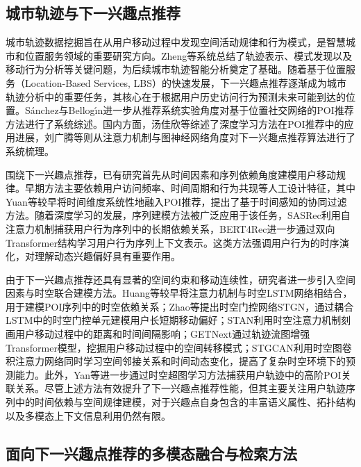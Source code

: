 \documentclass{rjthesis}
\begin{document}
\subsection{城市轨迹与下一兴趣点推荐}

城市轨迹数据挖掘旨在从用户移动过程中发现空间活动规律和行为模式，是智慧城市和位置服务领域的重要研究方向。Zheng等系统总结了轨迹表示、模式发现以及移动行为分析等关键问题，为后续城市轨迹智能分析奠定了基础\cite{zheng2015trajectory}。随着基于位置服务（Location-Based Services, LBS）的快速发展，下一兴趣点推荐逐渐成为城市轨迹分析中的重要任务，其核心在于根据用户历史访问行为预测未来可能到达的位置。S{\'a}nchez与Bellog{\'\i}n进一步从推荐系统实验角度对基于位置社交网络的POI推荐方法进行了系统综述\cite{sanchez2022poisurvey}。国内方面，汤佳欣等综述了深度学习方法在POI推荐中的应用进展\cite{tang2022dlpoi}，刘广腾等则从注意力机制与图神经网络角度对下一兴趣点推荐算法进行了系统梳理\cite{liu2025poisurvey}。

围绕下一兴趣点推荐，已有研究首先从时间因素和序列依赖角度建模用户移动规律。早期方法主要依赖用户访问频率、时间周期和行为共现等人工设计特征，其中Yuan等较早将时间维度系统性地融入POI推荐，提出了基于时间感知的协同过滤方法\cite{yuan2013timeaware}。随着深度学习的发展，序列建模方法被广泛应用于该任务，SASRec利用自注意力机制捕获用户行为序列中的长期依赖关系\cite{kang2018sasrec}，BERT4Rec进一步通过双向Transformer结构学习用户行为序列上下文表示\cite{sun2019bert4rec}。这类方法强调用户行为的时序演化，对理解动态兴趣偏好具有重要作用。

由于下一兴趣点推荐还具有显著的空间约束和移动连续性，研究者进一步引入空间因素与时空联合建模方法。Huang等较早将注意力机制与时空LSTM网络相结合，用于建模POI序列中的时空依赖关系\cite{huang2019atstlstm}；Zhao等提出时空门控网络STGN，通过耦合LSTM中的时空门控单元建模用户长短期移动偏好\cite{zhao2022stgn}；STAN利用时空注意力机制刻画用户移动过程中的距离和时间间隔影响\cite{luo2021stan}；GETNext通过轨迹流图增强Transformer模型，挖掘用户移动过程中的空间转移模式\cite{yang2022getnext}；STGCAN利用时空图卷积注意力网络同时学习空间邻接关系和时间动态变化，提高了复杂时空环境下的预测能力\cite{wang2022stgcan}。此外，Yan等进一步通过时空超图学习方法捕获用户轨迹中的高阶POI关联关系\cite{yan2023sthg}。尽管上述方法有效提升了下一兴趣点推荐性能，但其主要关注用户轨迹序列中的时间依赖与空间规律建模，对于兴趣点自身包含的丰富语义属性、拓扑结构以及多模态上下文信息利用仍然有限。

\subsection{面向下一兴趣点推荐的多模态融合与检索方法}
\end{document}
